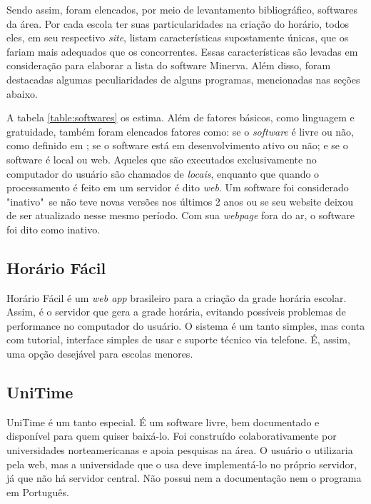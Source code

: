 \documentclass[12pt,a4paper]{article}
\begin{document}
		\par Sendo assim, foram elencados, por meio de levantamento bibliográfico, softwares da área. Por cada escola ter suas particularidades na criação do horário, todos eles, em seu respectivo \textit{site}, listam características supostamente únicas, que os fariam mais adequados que os concorrentes. Essas características são levadas em consideração para elaborar a lista do software Minerva. Além disso, foram destacadas algumas peculiaridades de alguns programas, mencionadas nas seções abaixo.

		\par A tabela \ref{table:softwares} os estima. Além de fatores básicos, como linguagem e gratuidade, também foram elencados fatores como: se o \textit{software} é livre ou não, como definido em \cite{publico}; se o software está em desenvolvimento ativo ou não; e se o software é local ou web. Aqueles que são executados exclusivamente no computador do usuário são chamados de \textit{locais}, enquanto que quando o processamento é feito em um servidor é dito \textit{web}. Um software foi considerado "inativo"\, se não teve novas versões nos últimos 2 anos ou se seu website deixou de ser atualizado nesse mesmo período. Com sua \textit{webpage} fora do ar, o software foi dito como inativo.

		\subsection{Horário Fácil}

			\par Horário Fácil é um \textit{web app} brasileiro para a criação da grade horária escolar. Assim, é o servidor que gera a grade horária, evitando possíveis problemas de performance no computador do usuário. O sistema é um tanto simples, mas conta com tutorial, interface simples de usar e suporte técnico via telefone. É, assim, uma opção desejável para escolas menores.


		\subsection{UniTime}

			\par UniTime é um tanto especial. É um software livre, bem documentado e disponível para quem quiser baixá-lo. Foi construído colaborativamente por universidades norteamericanas e apoia pesquisas na área. O usuário o utilizaria pela web, mas a universidade que o usa deve implementá-lo no próprio servidor, já que não há servidor central. Não possui nem a documentação nem o programa em Português.
\end{document}
